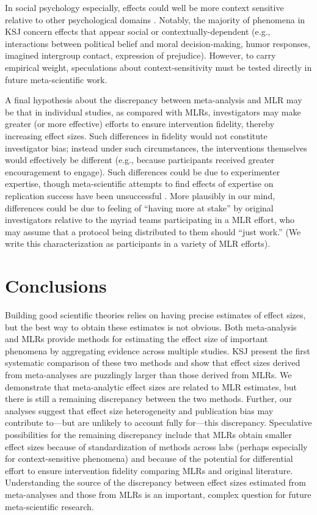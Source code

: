 \documentclass[man,floatsintext]{apa7}
\begin{document}
In social psychology especially, effects could well be more context sensitive relative to other psychological domains \parencite{van2016contextual,inbar2016association}. Notably, the majority of phenomena in KSJ concern effects that appear social or contextually-dependent (e.g., interactions between political belief and moral decision-making, humor responses, imagined intergroup contact, expression of prejudice). However, to carry empirical weight, speculations about context-sensitivity must be tested directly in future meta-scientific work. 

A final hypothesis about the discrepancy between meta-analysis and MLR may be that in individual studies, as compared with MLRs, investigators may make greater (or more effective) efforts to ensure intervention fidelity, thereby increasing effect sizes. Such differences in fidelity would not constitute investigator bias; instead under such circumstances, the interventions themselves would effectively be different (e.g., because participants received greater encouragement to engage). Such differences could be due to experimenter expertise, though meta-scientific attempts to find effects of expertise on replication success have been unsuccessful \parencite{open2015estimating}. More plausibly in our mind, differences could be due to feeling of “having more at stake” by original investigators relative to the myriad teams participating in a MLR effort, who may assume that a protocol being distributed to them should “just work.” (We write this characterization as participants in a variety of MLR efforts). 

\section{Conclusions}

Building good scientific theories relies on having precise estimates of effect sizes, but the best way to obtain these estimates is not obvious. Both meta-analysis and MLRs provide methods for estimating the effect size of important phenomena by aggregating evidence across multiple studies. KSJ present the first systematic comparison of these two methods and show that effect sizes derived from meta-analyses are puzzlingly larger than those derived from MLRs. We demonstrate that meta-analytic effect sizes are related to MLR estimates, but there is still a remaining discrepancy between the two methods. Further, our analyses suggest that effect size heterogeneity and publication bias may contribute to---but are unlikely to account fully for---this discrepancy. Speculative possibilities for the remaining discrepancy include that MLRs obtain smaller effect sizes because of standardization of methods across labs (perhaps especially for context-sensitive phenomena) and because of the potential for differential effort to ensure intervention fidelity comparing MLRs and original literature. Understanding the source of the discrepancy between effect sizes estimated from meta-analyses and those from MLRs is an important, complex question for future meta-scientific research. 
\end{document}
